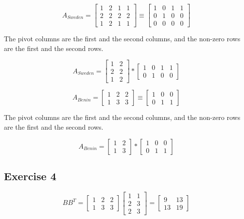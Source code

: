 \documentclass{article}
\begin{document}
\[A_{Sweden} =
    \begin{bmatrix}
        1 & 2 & 1 & 1 \\
        2 & 2 & 2 & 2 \\
        1 & 2 & 1 & 1
    \end{bmatrix}
    \equiv
    \begin{bmatrix}
        1 & 0 & 1 & 1 \\
        0 & 1 & 0 & 0 \\
        0 & 0 & 0 & 0
    \end{bmatrix}
\]

The pivot columns are the first and the second columns, and the non-zero rows are the first and the second rows.

\[A_{Sweden} =
    \begin{bmatrix}
        1 & 2 \\
        2 & 2 \\
        1 & 2
    \end{bmatrix}
    *
    \begin{bmatrix}
        1 & 0 & 1 & 1 \\
        0 & 1 & 0 & 0
    \end{bmatrix}
\]

\[A_{Benin} =
    \begin{bmatrix}
        1 & 2 & 2 \\
        1 & 3 & 3
    \end{bmatrix}
    \equiv
    \begin{bmatrix}
        1 & 0 & 0 \\
        0 & 1 & 1
    \end{bmatrix}
\]

The pivot columns are the first and the second columns, and the non-zero rows are the first and the second rows.

\[A_{Benin} =
    \begin{bmatrix}
        1 & 2 \\
        1 & 3
    \end{bmatrix}
    *
    \begin{bmatrix}
        1 & 0 & 0 \\
        0 & 1 & 1
    \end{bmatrix}
\]

\subsection{Exercise 4}
\[
    BB^{T} =
    \begin{bmatrix}
        1 & 2 & 2 \\
        1 & 3 & 3
    \end{bmatrix}
    \begin{bmatrix}
        1 & 1 \\
        2 & 3 \\
        2 & 3
    \end{bmatrix}
    = \begin{bmatrix}
        9  & 13 \\
        13 & 19
    \end{bmatrix}
\]
\end{document}
